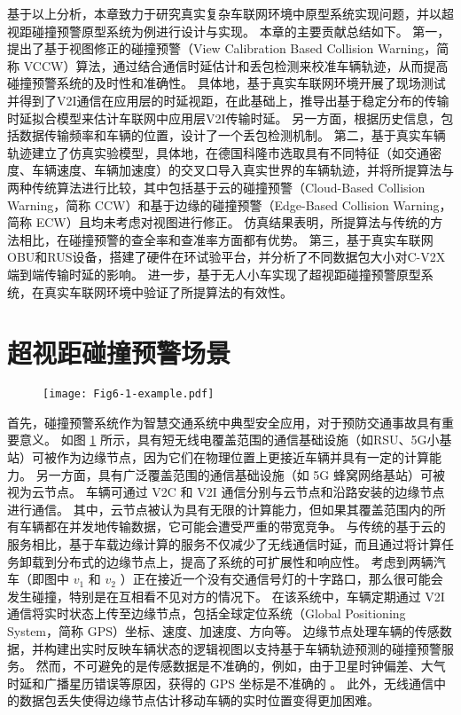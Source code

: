基于以上分析，本章致力于研究真实复杂车联网环境中原型系统实现问题，并以超视距碰撞预警原型系统为例进行设计与实现。
本章的主要贡献总结如下。
第一，提出了基于视图修正的碰撞预警（View Calibration Based Collision Warning，简称 VCCW）算法，通过结合通信时延估计和丢包检测来校准车辆轨迹，从而提高碰撞预警系统的及时性和准确性。
具体地，基于真实车联网环境开展了现场测试并得到了V2I通信在应用层的时延视距，在此基础上，推导出基于稳定分布的传输时延拟合模型来估计车联网中应用层V2I传输时延。
另一方面，根据历史信息，包括数据传输频率和车辆的位置，设计了一个丢包检测机制。
第二，基于真实车辆轨迹建立了仿真实验模型，具体地，在德国科隆市选取具有不同特征（如交通密度、车辆速度、车辆加速度）的交叉口导入真实世界的车辆轨迹，并将所提算法与两种传统算法进行比较，其中包括基于云的碰撞预警（Cloud-Based Collision Warning，简称 CCW）和基于边缘的碰撞预警（Edge-Based Collision Warning，简称 ECW）且均未考虑对视图进行修正。
仿真结果表明，所提算法与传统的方法相比，在碰撞预警的查全率和查准率方面都有优势。
第三，基于真实车联网OBU和RUS设备，搭建了硬件在环试验平台，并分析了不同数据包大小对C-V2X端到端传输时延的影响。
进一步，基于无人小车实现了超视距碰撞预警原型系统，在真实车联网环境中验证了所提算法的有效性。


\section{超视距碰撞预警场景}\label{section 6-2}


\begin{figure}[h] %
	\centering
	\texttt{[image: Fig6-1-example.pdf]}
	\label{fig 6-1}
\end{figure}

首先，碰撞预警系统作为智慧交通系统中典型安全应用，对于预防交通事故具有重要意义。
如图 \ref{fig 6-1} 所示，具有短无线电覆盖范围的通信基础设施（如RSU、5G小基站）可被作为边缘节点，因为它们在物理位置上更接近车辆并具有一定的计算能力。
另一方面，具有广泛覆盖范围的通信基础设施（如 5G 蜂窝网络基站）可被视为云节点。
车辆可通过 V2C 和 V2I 通信分别与云节点和沿路安装的边缘节点进行通信。
其中，云节点被认为具有无限的计算能力，但如果其覆盖范围内的所有车辆都在并发地传输数据，它可能会遭受严重的带宽竞争。 
与传统的基于云的服务相比，基于车载边缘计算的服务不仅减少了无线通信时延，而且通过将计算任务卸载到分布式的边缘节点上，提高了系统的可扩展性和响应性。
考虑到两辆汽车（即图中 $v_1$ 和 $v_2$ ）正在接近一个没有交通信号灯的十字路口，那么很可能会发生碰撞，特别是在互相看不见对方的情况下。
在该系统中，车辆定期通过 V2I 通信将实时状态上传至边缘节点，包括全球定位系统（Global Positioning System，简称 GPS）坐标、速度、加速度、方向等。
边缘节点处理车辆的传感数据，并构建出实时反映车辆状态的逻辑视图以支持基于车辆轨迹预测的碰撞预警服务。
然而，不可避免的是传感数据是不准确的，例如，由于卫星时钟偏差、大气时延和广播星历错误等原因，获得的 GPS 坐标是不准确的 \cite{liu2013improving}。
此外，无线通信中的数据包丢失使得边缘节点估计移动车辆的实时位置变得更加困难。

